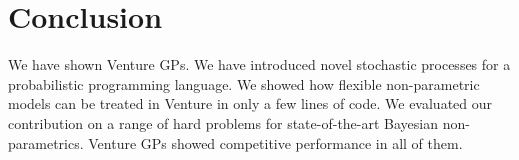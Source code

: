 \documentclass{article} %
\begin{document}

\FloatBarrier
\section{Conclusion}
We have shown Venture GPs. We have introduced novel stochastic processes for a probabilistic programming language. We showed how flexible non-parametric models can be treated in Venture in only a few lines of code. We evaluated our contribution on a range of hard problems for state-of-the-art Bayesian non-parametrics. Venture GPs showed competitive performance in all of them. 


\newpage


\end{document}
